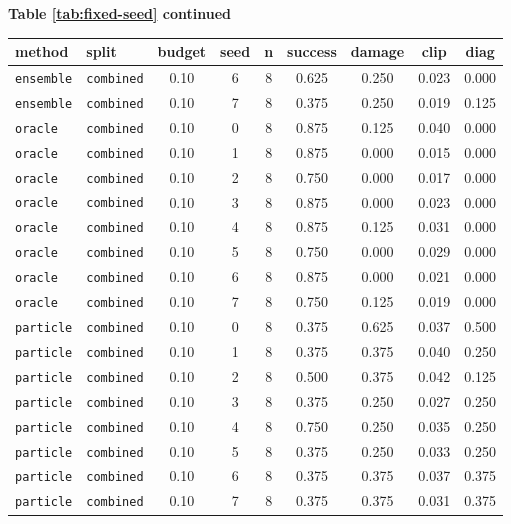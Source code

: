 \documentclass{article}
\begin{document}
\begin{center}
\textbf{Table \ref{tab:fixed-seed} continued}\\[0.4ex]
\begin{tabular}{llccccccc}
\toprule
method & split & budget & seed & n & success & damage & clip & diag \\
\midrule
\texttt{ensemble} & \texttt{combined} & 0.10 & 6 & 8 & 0.625 & 0.250 & 0.023 & 0.000 \\
\texttt{ensemble} & \texttt{combined} & 0.10 & 7 & 8 & 0.375 & 0.250 & 0.019 & 0.125 \\
\texttt{oracle} & \texttt{combined} & 0.10 & 0 & 8 & 0.875 & 0.125 & 0.040 & 0.000 \\
\texttt{oracle} & \texttt{combined} & 0.10 & 1 & 8 & 0.875 & 0.000 & 0.015 & 0.000 \\
\texttt{oracle} & \texttt{combined} & 0.10 & 2 & 8 & 0.750 & 0.000 & 0.017 & 0.000 \\
\texttt{oracle} & \texttt{combined} & 0.10 & 3 & 8 & 0.875 & 0.000 & 0.023 & 0.000 \\
\texttt{oracle} & \texttt{combined} & 0.10 & 4 & 8 & 0.875 & 0.125 & 0.031 & 0.000 \\
\texttt{oracle} & \texttt{combined} & 0.10 & 5 & 8 & 0.750 & 0.000 & 0.029 & 0.000 \\
\texttt{oracle} & \texttt{combined} & 0.10 & 6 & 8 & 0.875 & 0.000 & 0.021 & 0.000 \\
\texttt{oracle} & \texttt{combined} & 0.10 & 7 & 8 & 0.750 & 0.125 & 0.019 & 0.000 \\
\texttt{particle} & \texttt{combined} & 0.10 & 0 & 8 & 0.375 & 0.625 & 0.037 & 0.500 \\
\texttt{particle} & \texttt{combined} & 0.10 & 1 & 8 & 0.375 & 0.375 & 0.040 & 0.250 \\
\texttt{particle} & \texttt{combined} & 0.10 & 2 & 8 & 0.500 & 0.375 & 0.042 & 0.125 \\
\texttt{particle} & \texttt{combined} & 0.10 & 3 & 8 & 0.375 & 0.250 & 0.027 & 0.250 \\
\texttt{particle} & \texttt{combined} & 0.10 & 4 & 8 & 0.750 & 0.250 & 0.035 & 0.250 \\
\texttt{particle} & \texttt{combined} & 0.10 & 5 & 8 & 0.375 & 0.250 & 0.033 & 0.250 \\
\texttt{particle} & \texttt{combined} & 0.10 & 6 & 8 & 0.375 & 0.375 & 0.037 & 0.375 \\
\texttt{particle} & \texttt{combined} & 0.10 & 7 & 8 & 0.375 & 0.375 & 0.031 & 0.375 \\

\end{tabular}
\end{center}
\end{document}
